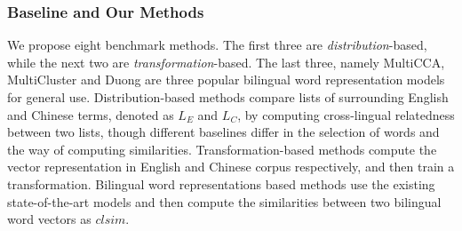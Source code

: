 \subsubsection{Baseline and Our Methods} 
We propose eight benchmark methods. 
The first three are \emph{distribution}-based, while the next two 
are \emph{transformation}-based. 
The last three, namely MultiCCA,
MultiCluster and Duong are three popular bilingual word representation models for general use.   
Distribution-based methods compare lists of surrounding
English and Chinese terms, denoted as $L_E$ and $L_C$, 
by computing cross-lingual relatedness between two lists, 
though different baselines differ in the
selection of words and the way of computing similarities.
Transformation-based methods compute the vector representation 
in English and Chinese corpus respectively, and
then train a transformation.
Bilingual word representations based methods use the existing state-of-the-art models and then compute the similarities between two bilingual word vectors as $clsim$.
